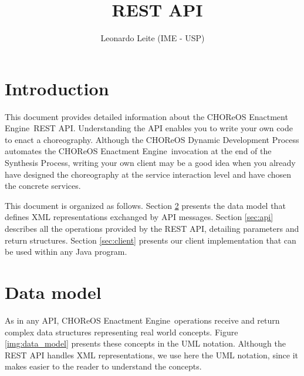 \documentclass[a4paper, 10pt]{article}
\title{\ee\ REST API}
\author{Leonardo Leite (IME - USP)}
\newcommand{\ee}{CHOReOS Enactment Engine}
\begin{document}
\maketitle

\section{Introduction}

This document provides detailed information about the \ee\ REST API. 
Understanding the API enables you to write your own code to enact a choreography.
Although the CHOReOS Dynamic Development Process automates the \ee\ invocation at the end of the Synthesis Process, writing your own client may be a good idea when you already have designed the choreography at the service interaction level and have chosen the concrete services. 

This document is organized as follows. Section \ref{sec:model} presents the data model that defines XML representations exchanged by API messages. Section \ref{sec:api} describes all the operations provided by the REST API, detailing parameters and return structures. Section \ref{sec:client} presents our client implementation that can be used within any Java program.

\section{Data model}
\label{sec:model}

As in any API, \ee\ operations receive and return complex data structures representing real world concepts. 
Figure \ref{img:data_model} presents these concepts in the UML notation.
Although the REST API handles XML representations, we use here the UML notation, since it makes easier to the reader to understand the concepts.
\end{document}
